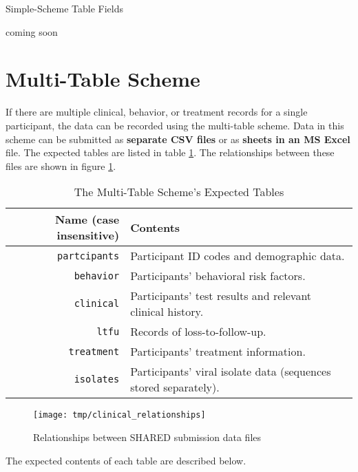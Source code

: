 \documentclass{article}
\begin{document}
\begin{table}
  \caption{Simple-Scheme Table Fields}
  \label{tbl:simple-scheme}
  coming soon
\end{table}


\section{Multi-Table Scheme}

If there are multiple clinical, behavior, or treatment records for a
single participant, the data can be recorded using the multi-table
scheme. Data in this scheme can be submitted as \textbf{separate CSV
  files} or as \textbf{sheets in an MS Excel} file. The expected
tables are listed in table \ref{tbl:multi-table-expected-tables}. The
relationships between these files are shown in figure
\ref{fig:relationships}.


\begin{table}[h!]
  \caption{The Multi-Table Scheme's Expected Tables}
  \label{tbl:multi-table-expected-tables}
  \begin{tabular}{rp{8cm}}
    Name (case insensitive) & Contents \\ \hline
    \verb|partcipants| & Participant ID codes and demographic data. \\
    \verb|behavior| &  Participants' behavioral risk factors. \\
    \verb|clinical| & Participants' test results and relevant clinical history. \\
    \verb|ltfu| & Records of loss-to-follow-up. \\
    \verb|treatment| &  Participants' treatment information. \\
    \verb|isolates| & Participants' viral isolate data (sequences stored separately). \\
  \end{tabular}
\end{table}

\begin{figure}
  \caption{Relationships between SHARED submission data files}
  \label{fig:relationships}
  \texttt{[image: tmp/clinical\_relationships]}
\end{figure}


The expected contents of each table are described below.


\end{document}
